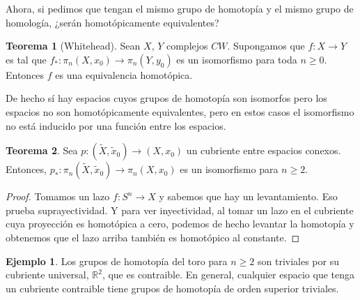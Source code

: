 \documentclass[spanish]{book}
\theoremstyle{definition}
\newtheorem*{teo}{Teorema}
\newtheorem*{ejem}{Ejemplo}
\newcommand{\R}{\mathbb{R}}
\begin{document}
	Ahora, si pedimos que tengan el mismo grupo de homotopía y el mismo grupo de homología, ¿serán homotópicamente equivalentes?
	
	\begin{teo}[Whitehead]
		Sean $X$, $Y$ complejos $CW$. Supongamos que $f:X\to Y$ es tal que $f_*:\pi_n(X,x_0)\to\pi_n(Y,y_0)$ es un isomorfismo para toda $n\geq0$. Entonces $f$ es una equivalencia homotópica.
	\end{teo}
	De hecho sí hay espacios cuyos grupos de homotopía son isomorfos pero los espacios no son homotópicamente equivalentes, pero en estos casos el isomorfismo no está inducido por una función entre los espacios.
	\begin{teo}
		Sea $p:(\tilde{X},\tilde{ x}_0)\to(X,x_0)$ un cubriente entre espacios conexos. Entonces, $p_*:\pi_n(\tilde{X},\tilde {x}_0)\to\pi_n(X,x_0)$ es un isomorfismo para $n\geq2$.
	\end{teo}
	\begin{proof}
		Tomamos un lazo $f:S^n\to X$ y sabemos que hay un levantamiento. Eso prueba suprayectividad. Y para ver inyectividad, al tomar un lazo en el cubriente cuya proyección es homotópica a cero, podemos de hecho levantar la homotopía y obtenemos que el lazo arriba también es homotópico al constante.
	\end{proof}
	\begin{ejem}
		Los grupos de homotopía del toro para $n\geq2$ son triviales por su cubriente universal, $\R^2$, que es contraible. En general, cualquier espacio que tenga un cubriente contraible tiene grupos de homotopía de orden superior triviales.
	\end{ejem}
		
\end{document}
